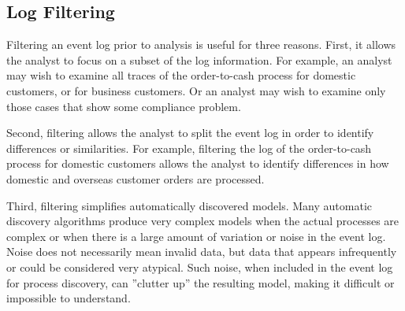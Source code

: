 \subsection*{Log Filtering}

Filtering an event log prior to analysis is useful for three reasons. First, it allows the analyst to focus on a subset of the log information. For example, an analyst may wish to examine all traces of the order-to-cash process for domestic customers, or for business customers. Or an analyst may wish to examine only those cases that show some compliance problem. 

Second, filtering allows the analyst to split the event log in order to identify differences or similarities. For example, filtering the log of the order-to-cash process for domestic customers allows the analyst to identify differences in how domestic and overseas customer orders are processed. 

Third, filtering simplifies automatically discovered models. Many automatic discovery algorithms produce very complex models when the actual processes are complex or when there is a large amount of variation or noise in the event log. Noise does not necessarily mean invalid data, but data that appears infrequently or could be considered very atypical. Such noise, when included in the event log for process discovery, can ''clutter up'' the resulting model, making it difficult or impossible to understand.


